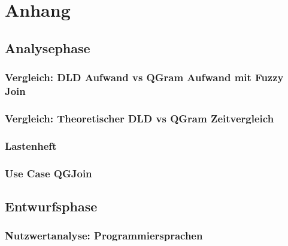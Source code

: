 \section{Anhang}
\subsection{Analysephase}
\subsubsection{Vergleich: DLD Aufwand vs QGram Aufwand mit Fuzzy Join}
\subsubsection{Vergleich: Theoretischer DLD vs QGram Zeitvergleich }
\subsubsection{Lastenheft}
\subsubsection{Use Case QGJoin}

\subsection{Entwurfsphase}
\subsubsection{Nutzwertanalyse: Programmiersprachen}
